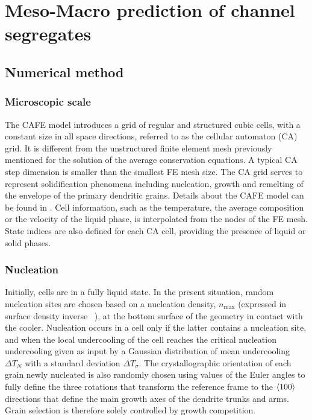 \section{Meso-Macro prediction of channel segregates}
%
\subsection{Numerical method}
%
\subsubsection{Microscopic scale}
The CAFE model introduces a grid of regular and structured cubic cells, with a constant size 
in all space directions, referred to as the cellular automaton (CA) grid. It is different from 
the unstructured finite element mesh previously mentioned for the solution of the average conservation 
equations. A typical CA step dimension is smaller than the smallest FE mesh size. The CA grid serves to 
represent solidification phenomena including nucleation, growth and remelting of the envelope of the 
primary dendritic grains. Details about the CAFE model can be found in \citep{carozzani_3d_2012,carozzani_direct_2013,carozzani_optimized_2014}. 
Cell information, such as the temperature, the average composition or the velocity of the liquid phase, is interpolated from 
the nodes of the FE mesh. State indices are also defined for each CA cell, providing the presence of liquid or solid phases. 
%
\subsubsection{Nucleation}
Initially, cells are in a fully liquid state. In the present situation, random nucleation sites are 
chosen based on a nucleation density, $n_\text{max}$ (expressed in surface density inverse \si{\per \uarea}), at the 
bottom surface of the geometry in contact with the cooler. Nucleation occurs in a cell only if the 
latter contains a nucleation site, and when the local undercooling of the cell reaches the critical 
nucleation undercooling given as input by a Gaussian distribution of mean undercooling $\Delta T_N$ with a 
standard deviation $\Delta T_\sigma$. The crystallographic orientation of each grain newly nucleated is also randomly 
chosen using values of the Euler angles to fully define the three rotations that transform the reference 
frame to the $\left \langle 100 \right \rangle$ directions that define the main growth axes of the dendrite trunks and arms. Grain 
selection is therefore solely controlled by growth competition.
%
